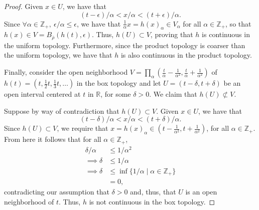 \documentclass[a4paper,10pt]{article}
\newcommand{\ZZ}{\mathbb{Z}}
\newcommand{\RR}{\mathbb{R}}
\begin{document}
\begin{solution}
\begin{proof}
        Given $x \in U$, we have that
        \begin{equation*}
            (t - \epsilon) / \alpha < x / \alpha < (t + \epsilon) / \alpha.
        \end{equation*}
        Since $\forall \alpha \in \ZZ_+,~ \epsilon / \alpha \leq \epsilon$, we have that $\tfrac{1}{\alpha} x = h(x)_\alpha \in V_\alpha$ for all $\alpha \in \ZZ_+$, so that $h(x) \in V = B_{\overline{\rho}}(h(t), \epsilon)$.
        Thus, $h(U) \subset V$, proving that $h$ is continuous in the uniform topology.
        Furthermore, since the product topology is coarser than the uniform topology, we have that $h$ is also continuous in the product topology.

        Finally, consider the open neighborhood $V = \prod_\alpha (\tfrac{t}{\alpha} - \tfrac{1}{\alpha^2}, \tfrac{t}{\alpha} + \tfrac{1}{\alpha^2})$ of $h(t) = (t, \tfrac{1}{2} t, \tfrac{1}{3} t, \ldots)$ in the box topology and let $U = (t - \delta, t + \delta)$ be an open interval centered at $t$ in $\RR$, for some $\delta > 0$.
        We claim that $h(U) \not\subset V$.

        Suppose by way of contradiction that $h(U) \subset V$.
        Given $x \in U$, we have that
        \begin{equation*}
            (t - \delta) / \alpha < x / \alpha < (t + \delta) / \alpha.
        \end{equation*}
        Since $h(U) \subset V$, we require that $x = h(x)_\alpha \in (t - \tfrac{1}{\alpha^2}, t + \tfrac{1}{\alpha^2})$, for all $\alpha \in \ZZ_+$.
        From here it follows that for all $\alpha \in \ZZ_+$,
        \begin{align*}
            \delta / \alpha &\leq 1 / \alpha^2 \\
            \implies \delta &\leq 1 / \alpha \\
            \implies \delta &\leq \inf\{1 / \alpha \mid \alpha \in \ZZ_+\} \\
                            &= 0,
        \end{align*}
        contradicting our assumption that $\delta > 0$ and, thus, that $U$ is an open neighborhood of $t$.
        Thus, $h$ is not continuous in the box topology.
    \end{proof}
    \bigskip





\end{solution}
\end{document}
